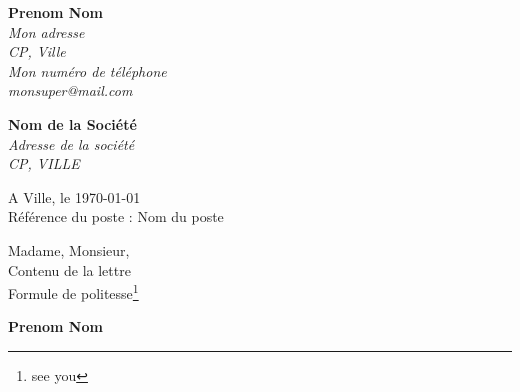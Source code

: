 \documentclass[11pt]{letter}
\begin{document}
 \sffamily
 \hfill
 \begin{flushleft}
 {\bfseries Prenom Nom}\\[.35ex]
 \small\itshape
 Mon adresse\\
 CP, Ville\\[.35ex]
 Mon numéro de téléphone\\
 monsuper@mail.com
 \end{flushleft}
 \begin{flushright}
 {\bfseries Nom de la Société}\\[.35ex]
 \small\itshape
 Adresse de la société\\
 CP, VILLE
 \end{flushright}
 \hfill
 \begin{flushright}
 A Ville, le \today \\
 Référence du poste : Nom du poste
 \end{flushright}
 Madame, Monsieur,\\
Contenu de la lettre\\
Formule de politesse\footnote{see you}\\
 \begin{center}
 {\bfseries Prenom Nom}\\
 \end{center}
 \vfill
 
\end{document}
